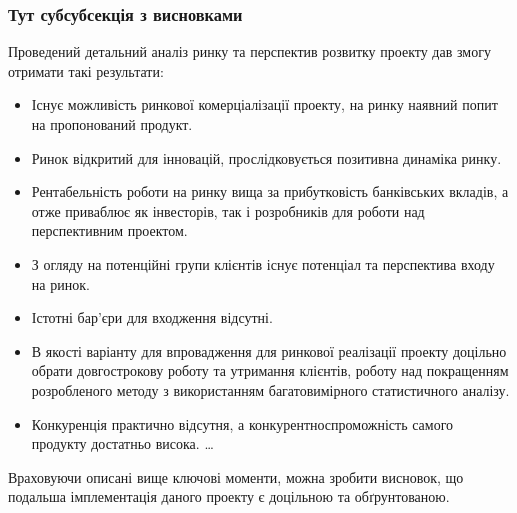 \subsubsection{Тут субсубсекція з висновками}
Проведений детальний аналіз ринку та перспектив розвитку проекту дав змогу отримати такі результати:
\begin{itemize}  
	\item Існує можливість ринкової комерціалізації проекту, на ринку наявний попит на пропонований продукт.
	\item Ринок відкритий для інновацій, прослідковується позитивна динаміка ринку. 
	\item Рентабельність роботи на ринку вища за прибутковість банківських вкладів, а отже приваблює як інвесторів, так і розробників для роботи над перспективним проектом. 
	\item З огляду на потенційні групи клієнтів існує потенціал та перспектива входу на ринок. 
	\item Істотні бар'єри для входження відсутні.
	\item В якості варіанту для впровадження для ринкової реалізації проекту доцільно обрати довгострокову роботу та утримання клієнтів, роботу над покращенням розробленого методу з використанням багатовимірного статистичного аналізу.
	\item Конкуренція практично відсутня, а конкурентноспроможність самого продукту достатньо висока.
	\ldots 
\end{itemize}
Враховуючи описані вище ключові моменти, можна зробити висновок, що подальша імплементація даного проекту є доцільною та обґрунтованою.
